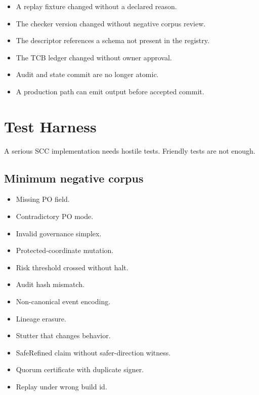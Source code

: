 \documentclass[11pt,oneside]{article}
\begin{document}
\begin{itemize}
\item A replay fixture changed without a declared reason.
\item The checker version changed without negative corpus review.
\item The descriptor references a schema not present in the registry.
\item The TCB ledger changed without owner approval.
\item Audit and state commit are no longer atomic.
\item A production path can emit output before accepted commit.
\end{itemize}


\section{Test Harness}
A serious SCC implementation needs hostile tests. Friendly tests are not enough.

\subsection{Minimum negative corpus}
\begin{itemize}
\item Missing PO field.
\item Contradictory PO mode.
\item Invalid governance simplex.
\item Protected-coordinate mutation.
\item Risk threshold crossed without halt.
\item Audit hash mismatch.
\item Non-canonical event encoding.
\item Lineage erasure.
\item Stutter that changes behavior.
\item SafeRefined claim without safer-direction witness.
\item Quorum certificate with duplicate signer.
\item Replay under wrong build id.
\end{itemize}
\end{document}
